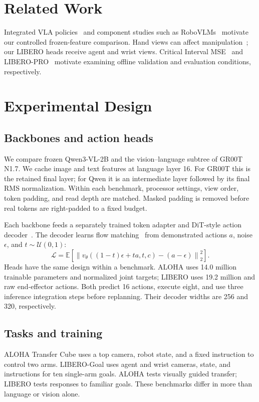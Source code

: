 \documentclass[conference]{IEEEtran}
\newcommand{\groot}{GR00T N1.7}
\newcommand{\qwen}{Qwen3-VL-2B}
\begin{document}
\IEEEpubidadjcol
\section{Related Work}
Integrated VLA policies~\cite{openvla,pi0,grootn1} and component studies
such as RoboVLMs~\cite{robovlms} motivate our controlled frozen-feature
comparison. Hand views can
affect manipulation~\cite{handview}; our LIBERO heads receive agent and wrist
views. Critical Interval MSE~\cite{cimse} and LIBERO-PRO~\cite{liberopro}
motivate examining offline validation and evaluation conditions, respectively.

\section{Experimental Design}
\subsection{Backbones and action heads}
We compare frozen \qwen{} and the vision--language subtree of \groot{}.
We cache image and text features at language layer 16. For GR00T this is the
retained final layer; for Qwen it is an intermediate layer followed by its
final RMS normalization. Within each benchmark, processor settings, view
order, token padding, and read depth are matched. Masked padding is removed
before real tokens are right-padded to a fixed budget.

Each backbone feeds a separately trained token adapter and DiT-style action
decoder~\cite{dit}. The decoder learns flow matching~\cite{flow} from
demonstrated actions $a$, noise $\epsilon$, and $t\sim\mathcal U(0,1)$:
\begin{equation}
 \mathcal L=\mathbb E\left[\left\|v_\theta((1-t)\epsilon+ta,t,c)
                    -(a-\epsilon)\right\|_2^2\right].
\end{equation}
Heads have the same design within a benchmark. ALOHA uses 14.0 million
trainable parameters and normalized joint targets; LIBERO uses 19.2 million
and raw end-effector actions. Both predict 16 actions, execute eight, and use
three inference integration steps before replanning. Their decoder widths are
256 and 320, respectively.

\newpage
\subsection{Tasks and training}
ALOHA Transfer Cube uses a top camera, robot state, and a fixed instruction
to control two arms. LIBERO-Goal uses agent and wrist cameras, state, and
instructions for ten single-arm goals. ALOHA tests visually guided transfer;
LIBERO tests responses to familiar goals. These benchmarks differ in more
than language or vision alone.
\end{document}

